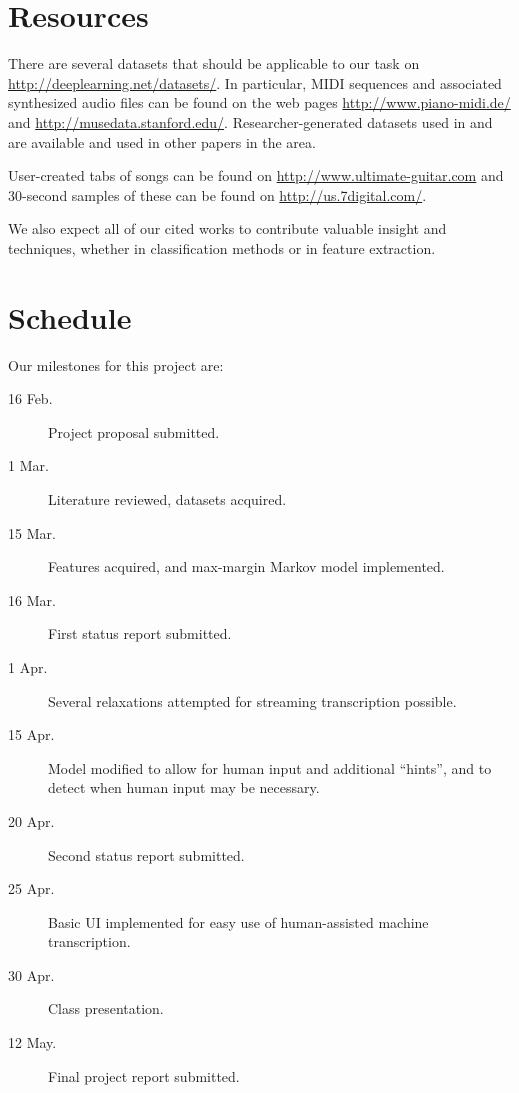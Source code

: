 \documentclass{article}
\begin{document}
\section{Resources}
There are several datasets that should be applicable to our task on
\url{http://deeplearning.net/datasets/}. In particular, MIDI sequences and
associated synthesized audio files can be found on the web pages
\url{http://www.piano-midi.de/} and \url{http://musedata.stanford.edu/}.
Researcher-generated datasets used in \cite{poliner2006discriminative} and
\cite{emiya2010multipitch} are available and used in other papers in the area.

User-created tabs of songs can be found on \url{http://www.ultimate-guitar.com}
and 30-second samples of these can be found on \url{http://us.7digital.com/}.

We also expect all of our cited works to contribute valuable insight and
techniques, whether in classification methods or in feature extraction.


\section{Schedule}
Our milestones for this project are:
\begin{description}
\item[16 Feb.] Project proposal submitted.
\item[ 1 Mar.] Literature reviewed, datasets acquired.
\item[15 Mar.] Features acquired, and max-margin Markov model implemented.
\item[16 Mar.] First status report submitted.
\item[ 1 Apr.] Several relaxations attempted for streaming transcription
  possible.
\item[15 Apr.] Model modified to allow for human input and additional
  ``hints'', and to detect when human input may be necessary.
\item[20 Apr.] Second status report submitted.
\item[25 Apr.] Basic UI implemented for easy use of human-assisted machine
  transcription.
\item[30 Apr.] Class presentation.
\item[12 May.] Final project report submitted.
\end{description}





\end{document}
